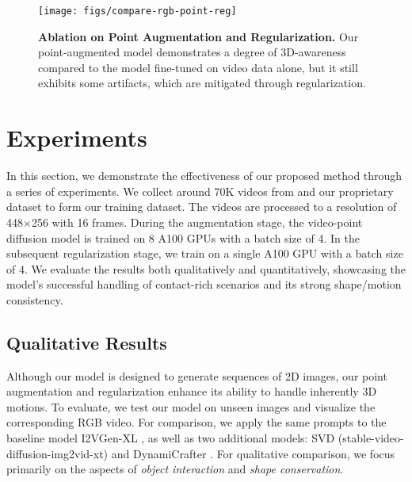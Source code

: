 \begin{figure}[h]
\texttt{[image: figs/compare-rgb-point-reg]}
  \caption{\textbf{Ablation on Point Augmentation and Regularization.} Our point-augmented model demonstrates a degree of 3D-awareness compared to the model fine-tuned on video data alone, but it still exhibits some artifacts, which are mitigated through regularization.}\label{fig:compare-rgb-point-reg}
\end{figure}

\section{Experiments}
In this section, we demonstrate the effectiveness of our proposed method through a series of experiments. We collect around 70K videos from \cite{chen2024panda} and our proprietary dataset to form our training dataset. The videos are processed to a resolution of 448$\times$256 with 16 frames. During the augmentation stage, the video-point diffusion model is trained on 8 A100 GPUs with a batch size of 4. In the subsequent regularization stage, we train on a single A100 GPU with a batch size of 4. We evaluate the results both qualitatively and quantitatively, showcasing the model's successful handling of contact-rich scenarios and its strong shape/motion consistency.

\subsection{Qualitative Results}
Although our model is designed to generate sequences of 2D images, our point augmentation and regularization enhance its ability to handle inherently 3D motions.
To evaluate, we test our model on unseen images and visualize the corresponding RGB video. For comparison, we apply the same prompts to the baseline model I2VGen-XL \cite{zhang2023i2vgen}, as well as two additional models: SVD (stable-video-diffusion-img2vid-xt) \cite{blattmann2023stablevideodiffusionscaling} and DynamiCrafter \cite{xing2025dynamicrafter}.
For qualitative comparison, we focus primarily on the aspects of \textit{object interaction} and \textit{shape conservation}.

